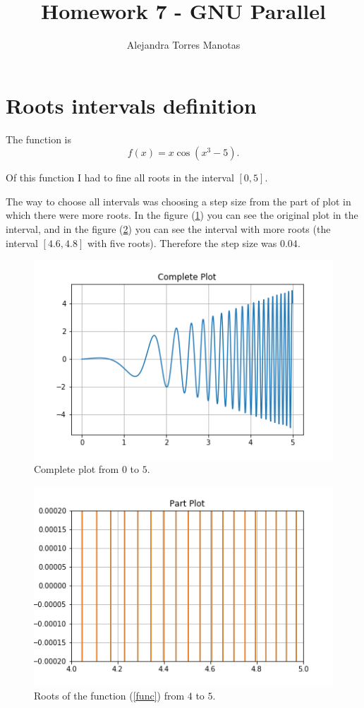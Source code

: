 \documentclass[]{scrartcl}
\title{Homework 7 - GNU Parallel}
\author{Alejandra Torres Manotas}
\date{}
\begin{document}
\maketitle

\section{Roots intervals definition}
The function is
\begin{equation}
	f\left(x\right)=x\cos\left(x^3-5\right).
	\label{func}
\end{equation}

Of this function I had to fine all roots in the interval $\left[0,5\right]$. 

The way to choose all intervals was choosing a step size from the part of plot in which there were more roots. In the figure (\ref{Complete}) you can see the original plot in the interval, and in the figure (\ref{Roots}) you can see the interval with more roots (the interval $\left[4.6,4.8\right]$ with five roots). Therefore the step size was $0.04$.

\begin{figure}[h]
	\centering
	\includegraphics[scale=0.8]{Completeplot}
	\caption{Complete plot from $0$ to $5$.}
	\label{Complete}
\end{figure}

\begin{figure}[h]
	\centering
	\includegraphics[scale=0.8]{roots(4-5)}
	\caption{Roots of the function (\ref{func}) from $4$ to $5$.}
	\label{Roots}
\end{figure}
\end{document}
